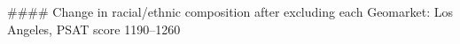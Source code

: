 #### Change in racial/ethnic composition after excluding each Geomarket: Los Angeles, PSAT score 1190–1260
